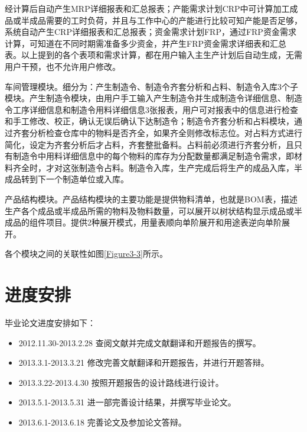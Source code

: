 \documentclass{Proposal}
\begin{document}
经计算后自动产生MRP详细报表和汇总报表；产能需求计划CRP中可计算加工成品或半成品需要的工时负荷，并且与工作中心的产能进行比较可知产能是否足够，系统自动产生CRP详细报表和汇总报表；资金需求计划FRP，通过FRP资金需求计算，可知道在不同时期需准备多少资金，并产生FRP资金需求详细表和汇总表。以上提到的各个表项和需求计算，都在用户输入主生产计划后自动生成，无需用户干预，也不允许用户修改。

车间管理模块。细分为：产生制造令、制造令齐套分析和占料、制造令入库3个子模块。产生制造令模块，由用户手工输入产生制造令并生成制造令详细信息、制造令工序详细信息和制造令用料详细信息3张报表，用户可对报表中的信息进行检查和手工修改、校正，确认无误后确认下达制造令；制造令齐套分析和占料模块，通过齐套分析检查仓库中的物料是否齐全，如果齐全则修改标志位。对占料方式进行简化，设定为齐套分析后才占料，齐套整批备料。占料前必须进行齐套分析，且只有制造令中用料详细信息中的每个物料的库存为分配数量都满足制造令需求，即材料齐全时，才对这张制造令占料。制造令入库，生产完成后将生产的成品入库，半成品转到下一个制造单位或入库。

产品结构模块。产品结构模块的主要功能是提供物料清单，也就是BOM表，描述生产各个成品或半成品所需的物料及物料数量，可以展开以树状结构显示成品或半成品的组件项目。提供2种展开模式，用量表顺向单阶展开和用途表逆向单阶展开。

各个模块之间的关联性如图\ref{Figure3-3}所示。



\section{进度安排}

毕业论文进度安排如下：
\begin{itemize}
\item 2012.11.30-2013.2.28 查阅文献并完成文献翻译和开题报告的撰写。
\item 2013.3.1-2013.3.21 修改完善文献翻译和开题报告，并进行开题答辩。
\item 2013.3.22-2013.4.30 按照开题报告的设计路线进行设计。
\item 2013.5.1-2013.5.31 进一部完善设计结果，并撰写毕业论文。
\item 2013.6.1-2013.6.18 完善论文及参加论文答辩。
\end{itemize}

\clearpage
\nocite{1}
\nocite{2}
\nocite{3}
\nocite{4}
\nocite{5}
\nocite{6}
\nocite{7}
\nocite{8}
\nocite{9}

\end{document}
